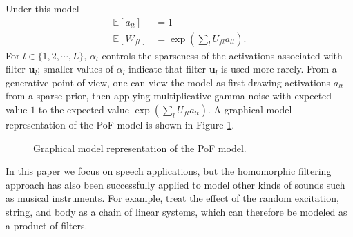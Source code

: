 \documentclass{article} %
\begin{document}
Under this model
\begin{equation}
\begin{split}
\mathbb{E}[a_{lt}] &= 1\\
\mathbb{E}[W_{ft}] &= \exp(\textstyle{\sum_l} U_{fl} a_{lt}).
\end{split}
\end{equation}
For $l \in \{1, 2, \cdots, L\}$, $\alpha_l$ controls the sparseness of
the activations associated with filter $\bm{u}_l$; smaller values of 
$\alpha_l$ indicate that filter $\bm{u}_l$ is used more
rarely. From a generative point of view, one can view the
model as first drawing activations $a_{lt}$ from a sparse prior, then
applying multiplicative gamma noise with expected value $1$ to the
expected value $\exp(\sum_l U_{fl} a_{lt})$. A graphical model
representation of the PoF model is shown in Figure
\ref{fig:sf_prior}. 
\begin{figure}[ht]
  \centering
     
  \caption{Graphical model representation of the PoF model.}
\label{fig:sf_prior}
\end{figure}

In this paper we focus on speech applications, but the homomorphic filtering approach has also been successfully applied to model other
kinds of sounds such as musical instruments. For example,  \cite{karjalainen1993towards}  treat the effect of the random excitation, string, and body as a chain of linear systems, which can therefore be modeled as a product of filters. 
\end{document}
